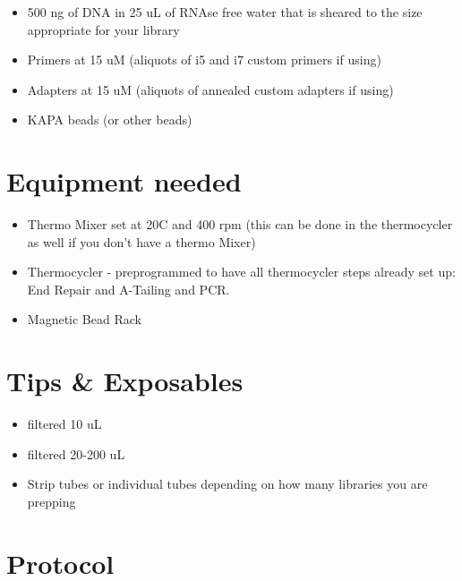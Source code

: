 \documentclass[
  letterpaper,
  DIV=11,
  numbers=noendperiod]{scrreprt}
\begin{document}
\begin{itemize}
\item
  500 ng of DNA in 25 uL of RNAse free water that is sheared to the size
  appropriate for your library
\item
  Primers at 15 uM (aliquots of i5 and i7 custom primers if using)
\item
  Adapters at 15 uM (aliquots of annealed custom adapters if using)
\item
  KAPA beads (or other beads)
\end{itemize}

\hypertarget{equipment-needed}{%
\section*{\texorpdfstring{\textbf{Equipment
needed}}{Equipment needed}}\label{equipment-needed}}

\begin{itemize}
\item
  Thermo Mixer set at 20C and 400 rpm (this can be done in the
  thermocycler as well if you don't have a thermo Mixer)
\item
  Thermocycler - preprogrammed to have all thermocycler steps already
  set up: End Repair and A-Tailing and PCR.
\item
  Magnetic Bead Rack
\end{itemize}

\hypertarget{tips-exposables}{%
\section*{\texorpdfstring{\textbf{Tips \&
Exposables}}{Tips \& Exposables}}\label{tips-exposables}}

\begin{itemize}
\item
  filtered 10 uL
\item
  filtered 20-200 uL
\item
  Strip tubes or individual tubes depending on how many libraries you
  are prepping
\end{itemize}

\hypertarget{protocol-4}{%
\section*{\texorpdfstring{\textbf{Protocol}}{Protocol}}\label{protocol-4}}
\end{document}
